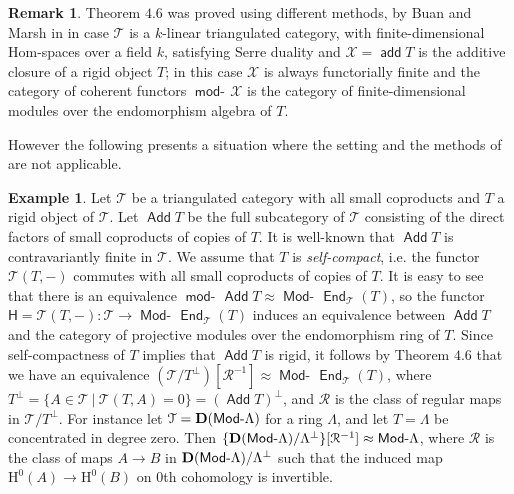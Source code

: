 \documentclass[oneside, a4paper,reqno]{amsart}
\numberwithin{equation}{section}
\theoremstyle{definition}
\newtheorem{rem}[thm]{Remark}
\newtheorem{exam}[thm]{Example}
\begin{document}
\begin{rem} Theorem $4.6$ was proved using different methods, by Buan and Marsh in \cite{BM1, BM2} in case ${\mathcal T}$ is a $k$-linear triangulated category, with finite-dimensional Hom-spaces over a field $k$, satisfying Serre duality and ${\mathcal X} = \operatorname*{\mathsf{add}} T$ is the additive closure of a rigid object $T$; in this case ${\mathcal X}$ is always functorially finite and the category of coherent functors $\operatorname*{\mathsf{mod}-\!}{\mathcal X}$ is the category of finite-dimensional modules over the endomorphism algebra of $T$.  
\end{rem}

However the following presents a situation where the setting and the methods of \cite{BM1, BM2} are not applicable. 

\begin{exam} Let ${\mathcal T}$ be a triangulated category with all small coproducts and $T$ a rigid object of ${\mathcal T}$. Let $\operatorname*{\mathsf{Add}} T$ be the full subcategory of ${\mathcal T}$ consisting of the direct factors of small coproducts of copies of $T$. It is well-known that $\operatorname*{\mathsf{Add}} T$ is contravariantly finite in ${\mathcal T}$.  We assume that $T$ is {\em self-compact}, i.e. the functor ${\mathcal T}(T,-)$ commutes with all small coproducts of copies of $T$.  It is easy to see that there is an equivalence $\operatorname*{\mathsf{mod}-\!}\operatorname*{\mathsf{Add}} T \approx \operatorname*{\mathsf{Mod}-\!}\operatorname*{\mathsf{End}}_{\mathcal T}(T)$, so the functor $\mathsf{H} = {\mathcal T}(T,-)  \colon {\mathcal T} {\longrightarrow} \operatorname*{\mathsf{Mod}-\!}\operatorname*{\mathsf{End}}_{\mathcal T}(T)$ induces an equivalence between $\operatorname*{\mathsf{Add}} T$ and the category of projective modules over the endomorphism ring of $T$. Since self-compactness of $T$ implies that $\operatorname*{\mathsf{Add}} T$ is rigid, it follows by Theorem $4.6$ that we have an equivalence $({\mathcal T}/T^{\bot})[\mathcal R^{-1}] \approx \operatorname*{\mathsf{Mod}-\!}\operatorname*{\mathsf{End}}_{\mathcal T}(T)$, where $T^{\bot} = \{A \in {\mathcal T} \ | \ {\mathcal T}(T,A) = 0\} =  (\operatorname*{\mathsf{Add}} T)^{\bot}$,  and $\mathcal R$ is the class of regular maps in ${\mathcal T}/T^{\bot}$. For instance let ${\mathcal T} = {\bf D}(\operatorname*{\mathsf{Mod}-\!}\Lambda)$ for a ring $\Lambda$, and let $T = \Lambda$ be concentrated in degree zero. Then $\{{\bf D}(\operatorname*{\mathsf{Mod}-\!}\Lambda)/\Lambda^{\bot}\}[\mathcal R^{-1}] \approx \operatorname*{\mathsf{Mod}-\!}\Lambda$, where $\mathcal R$ is the class of maps $A {\longrightarrow} B$ in ${\bf D}(\operatorname*{\mathsf{Mod}-\!}\Lambda)/\Lambda^{\bot}$ such that the induced map $\mathrm{H}^{0}(A) {\longrightarrow} \mathrm{H}^{0}(B)$ on $0$th cohomology is invertible. 
\end{exam} 
\end{document}
